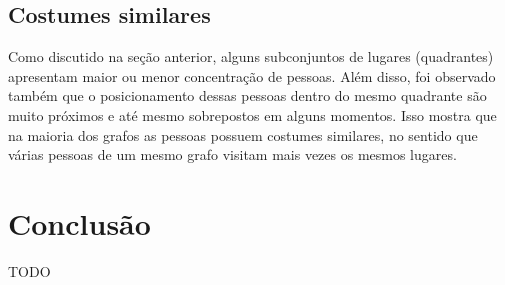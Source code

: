 \documentclass[12pt]{article}
\begin{document}
\subsection{Costumes similares}

Como discutido na seção anterior, alguns subconjuntos de lugares (quadrantes) apresentam maior ou menor concentração de pessoas. Além disso, foi observado também que o posicionamento dessas pessoas dentro do mesmo quadrante são muito próximos e até mesmo sobrepostos em alguns momentos. Isso mostra que na maioria dos grafos as pessoas possuem costumes similares, no sentido que várias pessoas de um mesmo grafo visitam mais vezes os mesmos lugares.

\section{Conclusão}

TODO


\footnotesize


\end{document}
